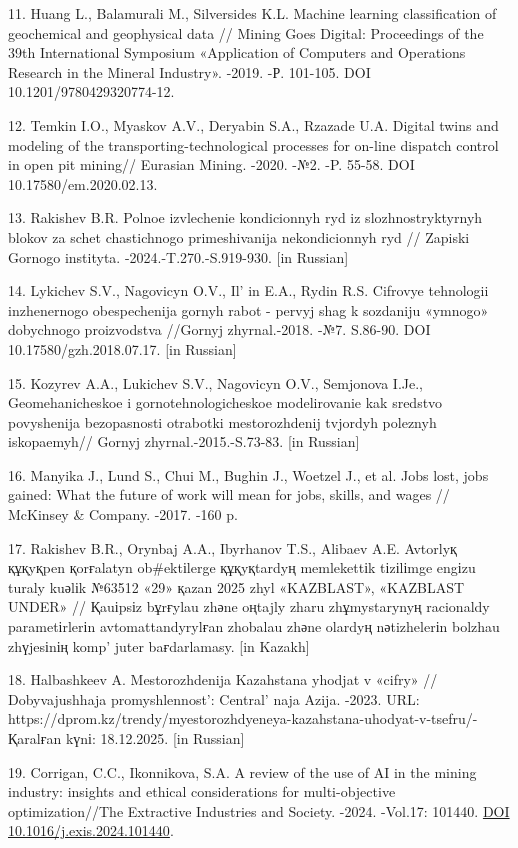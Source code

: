 \begin{refs}
11. Huang L., Balamurali M., Silversides K.L. Machine learning
classification of geochemical and geophysical data // Mining Goes
Digital: Proceedings of the 39th International Symposium «Application of
Computers and Operations Research in the Mineral Industry». -2019. -Р.
101-105. DOI 10.1201/9780429320774-12.

12. Temkin I.O., Myaskov A.V., Deryabin S.A., Rzazade U.A. Digital twins
and modeling of the transporting-technological processes for on-line
dispatch control in open pit mining// Eurasian Mining. -2020. -№2. -P.
55-58. DOI 10.17580/em.2020.02.13.

13. Rakishev B.R. Polnoe izvlechenie kondicionnyh ryd iz
slozhnostryktyrnyh blokov za schet chastichnogo primeshivanija
nekondicionnyh ryd // Zapiski Gornogo instityta.
-2024.-T.270.-S.919-930. {[}in Russian{]}

14. Lykichev S.V., Nagovicyn O.V., Il' in E.A., Rydin R.S.
Cifrovye tehnologii inzhenernogo obespechenija gornyh rabot - pervyj
shag k sozdaniju «ymnogo» dobychnogo proizvodstva //Gornyj
zhyrnal.-2018. -№7. S.86-90. DOI 10.17580/gzh.2018.07.17. {[}in
Russian{]}

15. Kozyrev A.A., Lukichev S.V., Nagovicyn O.V., Semjonova I.Je.,
Geomehanicheskoe i gornotehnologicheskoe modelirovanie kak sredstvo
povyshenija bezopasnosti otrabotki mestorozhdenij tvjordyh poleznyh
iskopaemyh// Gornyj zhyrnal.-2015.-S.73-83. {[}in Russian{]}

16. Manyika J., Lund S., Chui M., Bughin J., Woetzel J., et al. Jobs
lost, jobs gained: What the future of work will mean for jobs, skills,
and wages // McKinsey \& Company. -2017. -160 p.

17. Rakishev B.R., Orynbaj A.A., Ibyrhanov T.S., Alibaev A.E. Avtorlyқ
құқyқpen қorғalatyn ob\#ektіlerge құқyқtardyң memlekettіk tіzіlіmge
engіzu turaly kuәlіk №63512 «29» қazan 2025 zhyl «KAZBLAST», «KAZBLAST
UNDER» // Қauіpsіz bұrғylau zhәne oңtajly zharu zhұmystarynyң racionaldy
parametіrlerіn avtomattandyrylғan zhobalau zhәne olardyң nәtizhelerіn
bolzhau zhүjesіnің komp' juter baғdarlamasy. {[}in
Kazakh{]}

18. Halbashkeev A. Mestorozhdenija Kazahstana yhodjat v «cifry» //
Dobyvajushhaja promyshlennost':
Central' naja Azija. -2023. URL:
https://dprom.kz/trendy/myestorozhdyeneya-kazahstana-uhodyat-v-tsefru/-
Қaralғan kүnі: 18.12.2025. {[}in Russian{]}

19. Corrigan, C.C., Ikonnikova, S.A. A review of the use of AI in the
mining industry: insights and ethical considerations for multi-objective
optimization//The Extractive Industries and Society. -2024. -Vol.17:
101440. \href{https://doi.org/10.1016/j.exis.2024.101440}{DOI
10.1016/j.exis.2024.101440}.
\end{refs}

